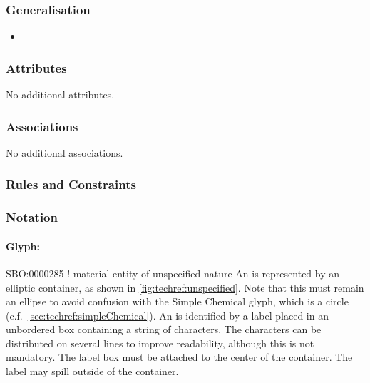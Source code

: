 \subsubsection{Generalisation}

\begin{itemize}
\item {}
\end{itemize}

\subsubsection{Attributes}

No additional attributes.

\subsubsection{Associations}

No additional associations.

\subsubsection{Rules and Constraints}

\begin{valrules}
\end{valrules}


\subsubsection{Notation}

\paragraph{Glyph: }

\begin{glyphDescription}
\glyphSboTerm SBO:0000285 ! material entity of unspecified nature
\glyphContainer An  is represented by an
elliptic container, as shown in \ref{fig:techref:unspecified}.  Note that this
must remain an ellipse to avoid confusion with the Simple Chemical
glyph, which is a circle (c.f.\, \ref{sec:techref:simpleChemical}).
\glyphLabel An  is identified by a label
placed in an unbordered box containing a string of characters.  The
characters can be distributed on several lines to improve readability,
although this is not mandatory.  The label box must be attached to the
center of the container.  The label may spill outside of the
container.
\end{glyphDescription}

